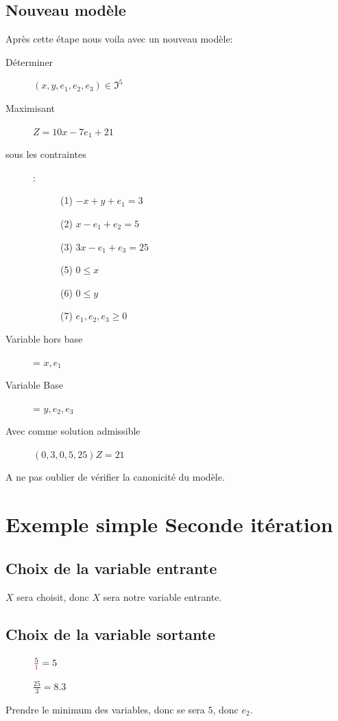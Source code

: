 \subsection{Nouveau modèle}
Après cette étape nous voila avec un nouveau modèle:
\begin{description}
\item[Déterminer] $(x,y,e_1,e_2,e_3) \in \Im^5$
\item[Maximisant] $Z = 10x - 7e_1 + 21$
\item[sous les contraintes]:
\begin{description}
\item[] (1) $-x + y + e_1 = 3$
\item[] (2) $x - e_1 + e_2 = 5$
\item[] (3) $3x - e_1 + e_3 = 25$
\item[] (5) $ 0 \leq x$
\item[] (6) $ 0 \leq y$
\item[] (7) $ e_1,e_2,e_3 \geq 0$
\end{description}
\item[Variable hors base] = $x,e_1$
\item[Variable Base] = $y,e_2,e_3$
\item[Avec comme solution admissible] $(0,3,0,5,25) Z=21$
\end{description}


A ne pas oublier de vérifier la canonicité du modèle.\\

\section{Exemple simple Seconde itération}
\subsection{Choix de la variable entrante}
$X$ sera choisit, donc $X$ sera notre variable entrante.\\

\subsection{Choix de la variable sortante}
\begin{description}
\item[] $\frac{5}{\textcolor{red}{1}} = 5$
\item[] $\frac{25}{3} = 8.3$
\end{description}
Prendre le minimum des variables, donc se sera $5$, donc $e_2$.\\

